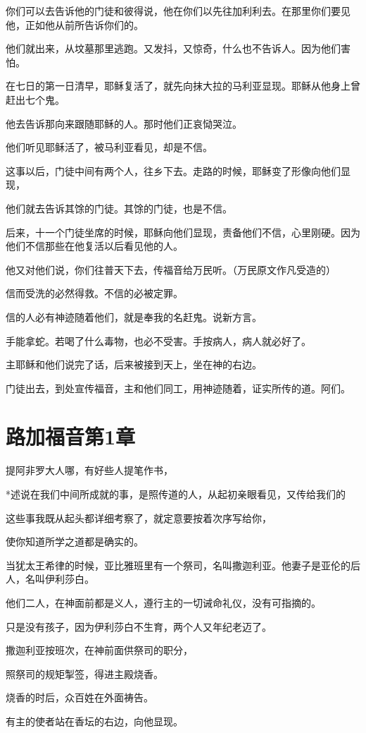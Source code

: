 \documentclass[12pt,oneside]{book}
\begin{document}
你们可以去告诉他的门徒和彼得说，他在你们以先往加利利去。在那里你们要见他，正如他从前所告诉你们的。

他们就出来，从坟墓那里逃跑。又发抖，又惊奇，什么也不告诉人。因为他们害怕。

在七日的第一日清早，耶稣复活了，就先向抹大拉的马利亚显现。耶稣从他身上曾赶出七个鬼。

他去告诉那向来跟随耶稣的人。那时他们正哀恸哭泣。

他们听见耶稣活了，被马利亚看见，却是不信。

这事以后，门徒中间有两个人，往乡下去。走路的时候，耶稣变了形像向他们显现，

他们就去告诉其馀的门徒。其馀的门徒，也是不信。

后来，十一个门徒坐席的时候，耶稣向他们显现，责备他们不信，心里刚硬。因为他们不信那些在他复活以后看见他的人。

他又对他们说，你们往普天下去，传福音给万民听。（万民原文作凡受造的）

信而受洗的必然得救。不信的必被定罪。

信的人必有神迹随着他们，就是奉我的名赶鬼。说新方言。

手能拿蛇。若喝了什么毒物，也必不受害。手按病人，病人就必好了。

主耶稣和他们说完了话，后来被接到天上，坐在神的右边。

门徒出去，到处宣传福音，主和他们同工，用神迹随着，证实所传的道。阿们。

\chapter{路加福音第1章}
提阿非罗大人哪，有好些人提笔作书，

*述说在我们中间所成就的事，是照传道的人，从起初亲眼看见，又传给我们的

这些事我既从起头都详细考察了，就定意要按着次序写给你，

使你知道所学之道都是确实的。

当犹太王希律的时候，亚比雅班里有一个祭司，名叫撒迦利亚。他妻子是亚伦的后人，名叫伊利莎白。

他们二人，在神面前都是义人，遵行主的一切诫命礼仪，没有可指摘的。

只是没有孩子，因为伊利莎白不生育，两个人又年纪老迈了。

撒迦利亚按班次，在神前面供祭司的职分，

照祭司的规矩掣签，得进主殿烧香。

烧香的时后，众百姓在外面祷告。

有主的使者站在香坛的右边，向他显现。
\end{document}

